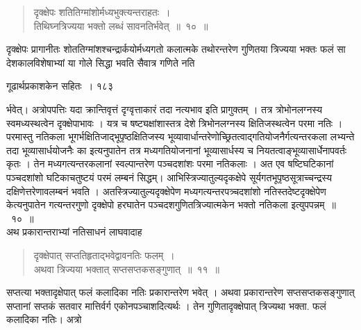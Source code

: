 \documentclass[11pt, openany]{book}
\begin{document}
\begin{quote}
 {\ssi दृक्क्षेपः शतितिग्मांशोर्मध्यभुक्त्यन्तराहतः~।\\
 तिथिघ्नत्रिज्यया भक्तो लब्धं सावनतिर्भवेत्~॥~१०~॥}
 \end{quote}

\begin{sloppypar}
 दृक्क्षेपः प्रागानीतः शोततिग्मांशश्चन्द्रार्कयोर्मध्यगतो कलात्मके तथोरन्तरेण गुणितया त्रिज्यया भक्तः फलं सा देशकालविशेषाभ्यां या गोले सिद्धा भवति सैवात्र गणिते नति\textendash
\end{sloppypar}

\newpage




\hspace{3cm} गूढार्थप्रकाशकेन सहितः~। \hfill १८३
\vspace{1cm}

\begin{sloppypar}
\noindent र्भवेत्। अत्रोपपत्तिः यदा क्रान्तिवृत्तं दृग्वृत्ताकारं तदा नत्यभाव इति प्रागुक्तम् । तत्र त्रोभोनलग्नस्य स्वमध्यस्थत्वेन दृक्क्षेपाभावः । यत्र च षष्ट्यक्षांशास्तत्र देशे त्रिभोनलग्नस्य क्षितिजस्थत्वेन परमा नतिः । परमास्तु नतिकला भूगर्भक्षितिजाद्भूपृष्ठक्षितिजस्य भूव्यावार्धान्तरेणोच्छ्रितत्वाद्गतियोजनैर्गत्यन्तरकला लभ्यन्ते तदा भूव्यासार्धयोजनैः का इत्यनुपातेन तत्र मध्यगतियोजनानां भूव्यासार्धस्य च नियतत्वाङ्भूव्यासार्धेनापवर्तः कृतः । तेन मध्यगत्यन्तरकलानां स्वल्पान्तरेण पञ्चदशांशः परमा नतिकलाः । अत एव षष्टिघटिकानां पञ्चदशांशो घटिकाचतुष्टयं परमं लम्बनं सिद्धम्। आभिस्त्रिज्यातुल्यदृकक्षेपे सूर्यगतभूपृष्ठसूत्राच्चन्द्रस्य दक्षिणेत्तरेणावलम्बनं भवति । अतस्त्रिज्यातुल्यदृक्क्षेपेण मध्यगत्यन्तरपत्र्चदशांशो नतिस्तदेष्टदृक्क्षेपेण केत्यनुपातेन गत्यन्तरगुणो दृक्क्षेपो हरघातेन पञ्चदशगुणितत्रिज्यात्मकेन भक्तो नतिकला इत्युपपन्नम्~॥~१०~॥\\
\noindent अथ प्रकारान्तराभ्यां नतिसाधनं लाघवादाह\textendash
\end{sloppypar}

\begin{quote}
  {\ssi दृक्क्षेपात् सप्ततिहृताद्भवेद्वावनतिः फलम्~।\\
 अथवा त्रिज्यया भक्तात् सप्तसप्तकसङ्गुणात्~॥~११~॥}
 \end{quote}

\begin{sloppypar}
 सप्तत्या भक्तादृक्षेपात् फलं कलादिका नतिः प्रकारान्तरेण भवेत् । अथवा प्रकारान्तरेण सप्तसप्तकसङ्गुणात् सप्तानां सप्तकं सतवार मात्तिर्वर्ग एकोनपञ्चाशदित्यर्थः । तेन गुणितादृक्क्षेपात् त्रिज्यथा भक्ता. फलं कलादिका नतिः। अत्रो\textendash
\end{sloppypar}
\end{document}
